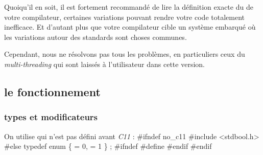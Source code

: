 \documentclass{scrartcl}%
\begin{document}
\eatline
{}\nwendcode{}Quoiqu'il en soit, il est fortement recommandé de lire la définition exacte du {\Tt{}\nwendquote} de votre compilateur, certaines variations pouvant rendre votre code totalement inefficace. Et d'autant plus que votre compilateur cible un système embarqué où les variations autour des standards sont choses communes.

Cependant, nous ne résolvons pas tous les problèmes, en particuliers ceux du \emph{multi-threading} qui sont laissés à l'utilisateur dans cette version.


\subsection{le fonctionnement}
\subsubsection{types et modificateurs}
On utilise {\Tt{}\nwendquote} qui n'est pas défini avant \emph{C11} :
\nwenddocs{}\endmoddef\nwstartdeflinemarkup{}\nwenddeflinemarkup
#ifndef no_c11
  #include <stdbool.h>
#else
typedef enum \{
   = 0,
   = 1
\} ;
#ifndef 
  #define 
#endif
#endif
\end{document}
